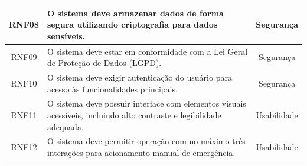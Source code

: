 \begin{table}[H]
\begin{tabular}{|c|p{8cm}|c|}
RNF08 &
O sistema deve armazenar dados de forma segura utilizando criptografia para dados sensíveis. &
Segurança \\
\hline

RNF09 &
O sistema deve estar em conformidade com a Lei Geral de Proteção de Dados (LGPD). &
Segurança \\
\hline

RNF10 &
O sistema deve exigir autenticação do usuário para acesso às funcionalidades principais. &
Segurança \\
\hline

RNF11 &
O sistema deve possuir interface com elementos visuais acessíveis, incluindo alto contraste e legibilidade adequada. &
Usabilidade \\
\hline

RNF12 &
O sistema deve permitir operação com no máximo três interações para acionamento manual de emergência. &
Usabilidade \\
\hline

\end{tabular}

\end{table}

